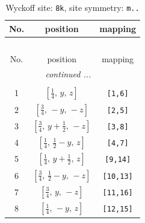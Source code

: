 \documentclass[fleqn,8pt]{jsarticle}
\begin{document}
\begin{longtable}{ccc}
\caption{Wyckoff site: {\tt 8k}, site symmetry: {\tt m..}}
 \\
 \hline \hline
No. & position & mapping \\ \hline \endfirsthead

\multicolumn{2}{l}{\tablename\ \thetable{}} \\
 \hline \hline
No. & position & mapping \\ \hline \endhead

 \hline \hline
\multicolumn{2}{r}{\footnotesize\it continued ...} \\ \endfoot

 \hline \hline
\multicolumn{2}{r}{} \\ \endlastfoot

1 & $\left[ \frac{1}{4},\, y,\, z \right]$ & {\tt [1,6]} \\ \hline
2 & $\left[ \frac{3}{4},\, - y,\, - z \right]$ & {\tt [2,5]} \\ \hline
3 & $\left[ \frac{3}{4},\, y + \frac{1}{2},\, - z \right]$ & {\tt [3,8]} \\ \hline
4 & $\left[ \frac{1}{4},\, \frac{1}{2} - y,\, z \right]$ & {\tt [4,7]} \\ \hline
5 & $\left[ \frac{1}{4},\, y + \frac{1}{2},\, z \right]$ & {\tt [9,14]} \\ \hline
6 & $\left[ \frac{3}{4},\, \frac{1}{2} - y,\, - z \right]$ & {\tt [10,13]} \\ \hline
7 & $\left[ \frac{3}{4},\, y,\, - z \right]$ & {\tt [11,16]} \\ \hline
8 & $\left[ \frac{1}{4},\, - y,\, z \right]$ & {\tt [12,15]} \\
\end{longtable}
\renewcommand{\arraystretch}{1.2}
\end{document}
